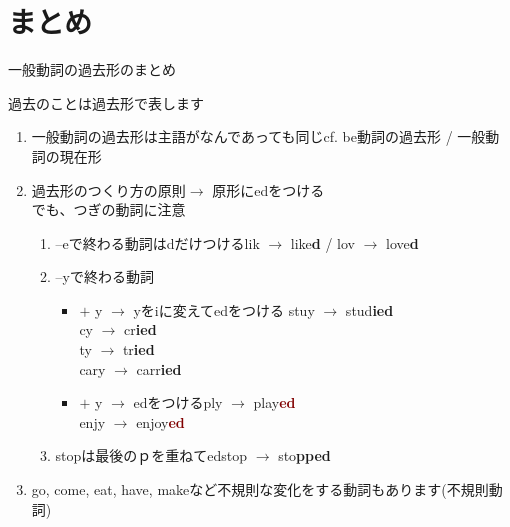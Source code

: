 \documentclass[aspectratio=169,xcolor={dvipsnames,table}]{beamer}
\begin{document}
\section{まとめ}
\begin{frame}[plain]{一般動詞の過去形のまとめ}
 \begin{block}{過去のことは過去形で表します}\small
\pause
\begin{enumerate}
 \item 一般動詞の過去形は主語がなんであっても同じ\hfill{}{\scriptsize cf. be動詞の過去形 / 一般動詞の現在形}\pause
 \item 過去形のつくり方の原則$\longrightarrow$ 原形にedをつける\\\pause
でも、つぎの動詞に注意\pause
       \begin{enumerate}
	\item --eで終わる動詞はdだけつける\hfill{}lik $\rightarrow$ like\textcolor{OliveGreen}{\bfseries d} / lov $\rightarrow$ love\textcolor{OliveGreen}{\bfseries d}\pause
	\item --yで終わる動詞\pause
\begin{itemize}[circle]
	         \item {} $+$ y $\longrightarrow$ yをiに変えてedをつける%
\hfill{}stuy $\rightarrow$ stud\textcolor{NavyBlue}{\bfseries ied}\\
\hfill{}cy $\rightarrow$ cr\textcolor{NavyBlue}{\bfseries ied}\\
\hfill{}ty $\rightarrow$ tr\textcolor{NavyBlue}{\bfseries ied}\\
\hfill{}cary $\rightarrow$ carr\textcolor{NavyBlue}{\bfseries ied}\pause
  \item {} $+$ y $\longrightarrow$ edをつける\hfill{}ply $\rightarrow$ play\textcolor{Maroon}{\bfseries ed}\\
\hfill{}enjy $\rightarrow$ enjoy\textcolor{Maroon}{\bfseries ed}\pause
	      \end{itemize}
	\item stopは最後のｐを重ねてed\hfill{}stop $\longrightarrow$ sto\textcolor{BurntOrange}{\bfseries pped}
       \end{enumerate}\pause
 \item go, come, eat, have, makeなど不規則な変化をする動詞もあります(不規則動詞)
\end{enumerate}

\end{block}

\end{frame}
\end{document}
